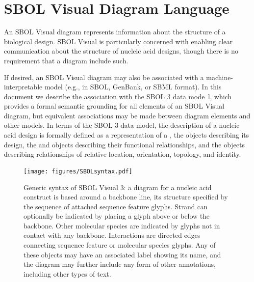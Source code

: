 \section{SBOL Visual Diagram Language}
\label{sec:language}

An SBOL Visual diagram represents information about the structure of a biological design.
SBOL Visual is particularly concerned with enabling clear communication about the structure of nucleic acid designs, though there is no requirement that a diagram include such.

If desired, an SBOL Visual diagram may also be associated with a machine-interpretable model (e.g., in SBOL, GenBank, or SBML format).
In this document we describe the association with the SBOL 3 data mode~\citep{SBOL3_0}l, which provides a formal semantic grounding for all elements of an SBOL Visual diagram, but equivalent associations may be made between diagram elements and other models.
%
In terms of the SBOL 3 data model, the description of a nucleic acid design is formally defined as a representation of a , the  objects describing its design, the  and  objects describing their functional relationships, and the  objects describing relationships of relative location, orientation, topology, and identity.

\begin{figure}[h!]
\centering
\texttt{[image: figures/SBOLsyntax.pdf]}
\caption{Generic syntax of SBOL Visual 3:  
a diagram for a nucleic acid construct is based around a backbone line, its structure specified by the sequence of attached sequence feature glyphs.  
Strand can optionally be indicated by placing a glyph above or below the backbone.  
Other molecular species are indicated by glyphs not in contact with any backbone.
Interactions are directed edges connecting sequence feature or molecular species glyphs.
Any of these objects may have an associated label showing its name, and the diagram may further include any form of other annotations, including other types of text.}
\label{f:syntax}
\end{figure}

